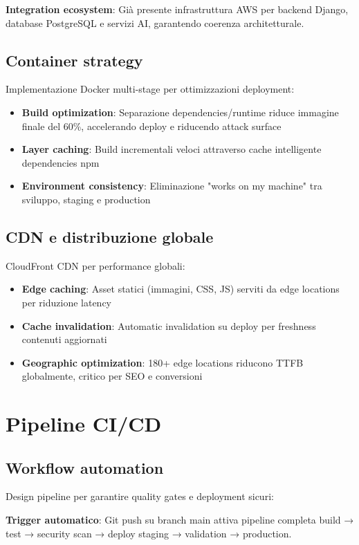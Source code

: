 \textbf{Integration ecosystem}: Già presente infrastruttura AWS per backend Django, 
database PostgreSQL e servizi AI, garantendo coerenza architetturale.

\subsection{Container strategy}
Implementazione Docker multi-stage per ottimizzazioni deployment:
\begin{itemize}
  \item \textbf{Build optimization}: Separazione dependencies/runtime riduce 
  immagine finale del 60\%, accelerando deploy e riducendo attack surface
  \item \textbf{Layer caching}: Build incrementali veloci attraverso cache 
  intelligente dependencies npm
  \item \textbf{Environment consistency}: Eliminazione "works on my machine" 
  tra sviluppo, staging e production
\end{itemize}

\subsection{CDN e distribuzione globale}
CloudFront CDN per performance globali:
\begin{itemize}
  \item \textbf{Edge caching}: Asset statici (immagini, CSS, JS) serviti da 
  edge locations per riduzione latency
  \item \textbf{Cache invalidation}: Automatic invalidation su deploy per 
  freshness contenuti aggiornati
  \item \textbf{Geographic optimization}: 180+ edge locations riducono TTFB 
  globalmente, critico per SEO e conversioni
\end{itemize}

\section{Pipeline CI/CD}

\subsection{Workflow automation}
Design pipeline per garantire quality gates e deployment sicuri:

\textbf{Trigger automatico}: Git push su branch main attiva pipeline completa 
build → test → security scan → deploy staging → validation → production.

